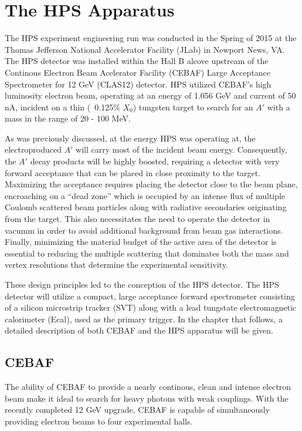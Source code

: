 
\chapter{The HPS Apparatus}

The HPS experiment engineering run was conducted in the Spring of 2015 at the
Thomas Jefferson National Accelerator Facility (JLab) in Newport News, VA.  The
HPS detector was installed within the Hall B alcove upstream of the Continous 
Electron Beam Acelerator Facility (CEBAF) Large Acceptance Spectrometer for 12
GeV (CLAS12) detector.  HPS utilized CEBAF's high luminosity electron beam,
operating at an energy of 1.056 GeV and current of 50 nA, incident on a thin
(~0.125\% $X_{0}$) tungsten target to search for an $A'$ with a mass in the 
range of 20 - 100 MeV.  

As was previously discussed, at the energy HPS was operating at, the 
electroproduced $A'$ will carry most of the incident beam energy.  Consequently,
the $A'$ decay products will be highly boosted, requiring a detector with very
forward acceptance that can be placed in close proximity to the target.
Maximizing the acceptance requires placing the detector close to the beam plane,
encroaching on a ``dead zone'' which is occupied by an intense flux of multiple
Coulomb scattered beam particles along with radiative secondaries originating
from the target.  This also necessitates the need to operate the detector in 
vacumm in order to avoid additional background from beam gas interactions. 
Finally, minimizing the material budget of the active area of the detector is 
essential to reducing the multiple scattering that dominates both the mass and
vertex resolutions that determine the experimental sensitivity.

These design principles led to the conception of the HPS detector.  The HPS 
detector will utilize a compact, large acceptance forward spectrometer 
consisting of a silicon microstrip tracker (SVT) along with a lead tungstate
electromagnetic calorimeter (Ecal), used as the primary trigger.  In the chapter
that follows, a detailed description of both CEBAF and the HPS apparatus will be
given.

\section{CEBAF}

The ability of CEBAF to provide a nearly continous, clean and intense electron
beam make it ideal to search for heavy photons with weak couplings.  With the
recently completed 12 GeV upgrade, CEBAF is capable of simultaneously providing
electron beams to four experimental halls.

